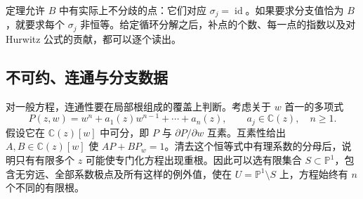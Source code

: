 定理允许 \(B\) 中有实际上不分歧的点：它们对应 \(\sigma_j=\operatorname{id}\)。如果要求分支值恰为 \(B\)，就要求每个 \(\sigma_j\) 非恒等。给定循环分解之后，补点的个数、每一点的指数以及对 Hurwitz 公式的贡献，都可以逐个读出。

\subsection{不可约、连通与分支数据}
\label{g4:subsec:0204:04}

对一般方程，连通性要在局部根组成的覆盖上判断。考虑关于 \(w\) 首一的多项式
\[
	P(z,w)=w^n+a_1(z)w^{n-1}+\cdots+a_n(z),
	\qquad a_j\in\mathbb C(z),\quad n\ge1.
\]
假设它在 \(\mathbb C(z)[w]\) 中可分，即 \(P\) 与 \(\partial P/\partial w\) 互素。互素性给出 \(A,B\in\mathbb C(z)[w]\) 使 \(AP+BP_w=1\)。清去这个恒等式中有理系数的分母后，说明只有有限多个 \(z\) 可能使专门化方程出现重根。因此可以选有限集合 \(S\subset\mathbb P^1\)，包含无穷远、全部系数极点及所有这样的例外值，使在 \(U=\mathbb P^1\setminus S\) 上，方程始终有 \(n\) 个不同的有限根。

